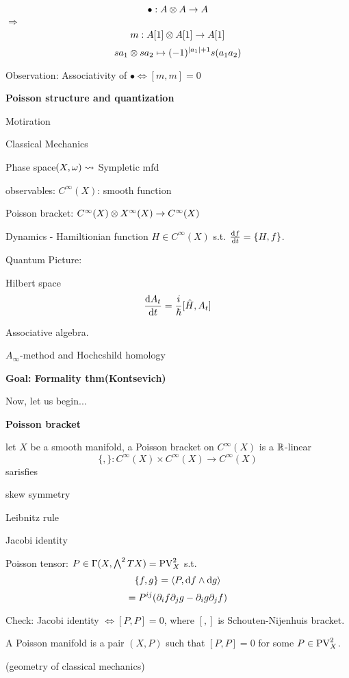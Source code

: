 $$\bullet:A\otimes A\to A$$
$\Longrightarrow$
$$m:A[1]\otimes A[1]\to A[1]$$
$$sa_1\otimes sa_2\mapsto(-1)^{|a_1|+1}s(a_1a_2)$$

Observation:
Associativity of $\bullet\Longleftrightarrow[m,m]=0$



\textbf{Poisson structure and quantization}

Motiration

Classical Mechanics

Phase space$(X,\omega)\rightsquigarrow$ Sympletic mfd

observables: $C^{\infty}(X)$: smooth function

Poisson bracket: 
$C^{\infty}(X)\otimes X^{\infty}(X)\to C^{\infty}(X)$

Dynamics - Hamiltionian function $H\in C^{\infty}(X)$
s.t. $\frac{\mathrm{d} f}{\mathrm{d} t}=\{H,f\}$.


Quantum Picture:

Hilbert space
$$\frac{\mathrm{d} A_t}{\mathrm{d} t}=\frac{i}{\hbar}[\hat{H},A_t]$$

Associative algebra.

$A_{\infty}$-method and Hochcshild homology

\textbf{Goal: Formality thm(Kontsevich)}

Now, let us begin...

\vs

\textbf{Poisson bracket}

\begin{definition}
let $X$ be a smooth manifold, a Poisson bracket 
on $C^{\infty}(X)$ is  a $\mathbb{R}$-linear 
$$\{,\}:C^{\infty}(X)\times C^{\infty}(X)\to C^{\infty}(X)$$
sarisfies

skew symmetry

Leibnitz rule

Jacobi identity
\end{definition}

Poisson tensor:
$P\in\Gamma(X,\bigwedge\nolimits^{2}TX)=\operatorname{PV}_X^2$ s.t.
$$\{f,g\}=\langle P, \mathrm{d} f\wedge \mathrm{d} g\rangle$$
$$=P^{ij}(\partial_i f\partial_jg-\partial_ig\partial_jf)$$

Check: Jacobi identity $\iff[P,P]=0$, where 
$[,]$ is Schouten-Nijenhuis bracket.

\begin{definition}
A Poisson manifold is a pair $(X,P)$ such that 
$[P,P]=0$ for some $P\in\operatorname{PV}_X^2$.
\end{definition}
(geometry of classical mechanics)

